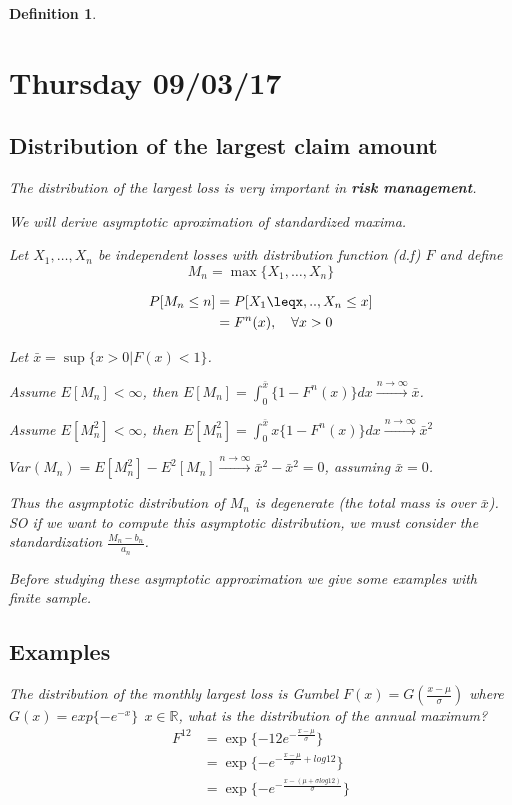 \documentclass[11pt,a4paper,oneside]{article}\usepackage[]{graphicx}\usepackage[]{color}
\newtheorem{defi}[subsection]{Definition}
\begin{document}
\begin{algin*}
\begin{defi}
\section{Thursday 09/03/17} 
\subsection{Distribution of the largest claim amount}

The distribution of the largest loss is very important in \textbf{risk management}.

We will derive asymptotic aproximation of standardized maxima.

Let $X_1,\ldots,X_n$ be independent losses with distribution function (d.f) $F$ and define 
\[M_n=\max\{X_1,\ldots,X_n\}\]

\begin{align*}
P[M_n\leq n] &= P[X_1\leqx,..,X_n\leq x]\\
&=F^n(x), \quad  \forall x>0\\
\end{align*}

Let $\bar{x}=\sup\{x>0|F(x)<1\}$.

Assume $E[M_n]<\infty$, then $E[M_n]=\displaystyle\int_{0}^{\bar{x}}\{1-F^n(x)\}dx\xrightarrow{n\rightarrow \infty}{\bar{x}}$.

Assume $E[M^2_n]<\infty$, then $E[M_n^2]=\displaystyle\int_{0}^{\bar{x}}x\{1-F^n(x)\}dx\xrightarrow{n\rightarrow \infty}{\bar{x}^2}$

$Var(M_n)=E[M^2_n]-E^2[M_n]\xrightarrow{n\rightarrow \infty}{\bar{x}^2-\bar{x}^2}=0$, assuming $\bar{x}=0$.\newline

Thus the asymptotic distribution of $M_n$ is degenerate (the total mass is over $\bar{x}$). SO if we want to compute this asymptotic distribution, we must consider the standardization $\frac{M_n-b_n}{a_n}$.

Before studying these asymptotic approximation we give some examples with finite sample.
\subsection{Examples}
The distribution  of the monthly largest loss is Gumbel $F(x)=G(\frac{x-\mu}{\sigma})$ where $G(x)=exp\{-e^{-x}\}\ \ x\in\mathbb{R}$, what is the distribution of the annual maximum?
\begin{align*}
F^{12}&=\exp\{-12e^{-\frac{x-\mu}{\sigma}}\}\\
&=\exp\{-e^{-\frac{x-\mu}{\sigma}+log 12}\}\\
&=\exp\{-e^{-\frac{x-(\mu+\sigma log 12)}{\sigma}}\}
\end{align*}


\end{defi}
\end{algin*}
\end{document}
